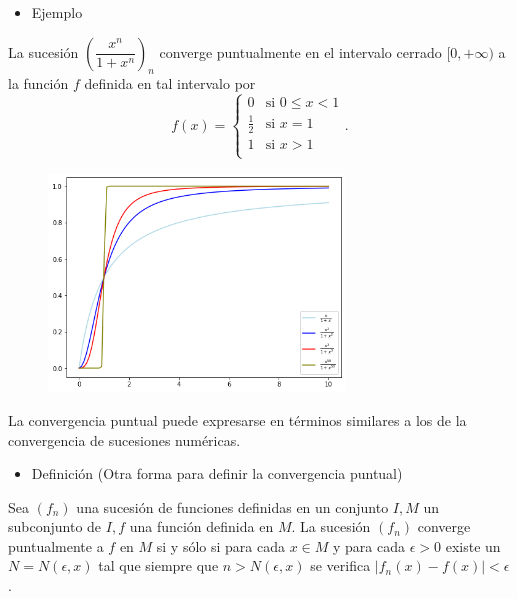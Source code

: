 \begin{itemize}[label=\color{red}\textbullet, leftmargin=*]
	\item \color{lightblue}Ejemplo
\end{itemize}
La sucesión $\left(\dfrac{x^n}{1+x^n}\right)_n$ converge puntualmente en el intervalo cerrado $[0,+\infty)$ a la función $f$ definida en tal intervalo por \[ f(x)=\left\{\begin{array}{ll}
	0 & \text{si }0\le x <1\\
	\frac{1}{2} & \text{si }x=1\\
	1 & \text{si } x >1\\
\end{array}\right.. \]

\begin{figure}[h]
	\centering
	\includegraphics[width=0.7\textwidth]{"Temas/Tema 4/Gráfica 2.png"}
\end{figure}


La convergencia puntual puede expresarse en términos similares a los de la convergencia de sucesiones numéricas.
\begin{itemize}[label=\color{red}\textbullet, leftmargin=*]
	\item \color{lightblue}Definición (Otra forma para definir la convergencia puntual)
\end{itemize}
Sea $(f_n)$ una sucesión de funciones definidas en un conjunto $I,M$ un subconjunto de $I,f$ una función definida en $M$. La sucesión $(f_n)$ converge puntualmente a $f$ en $M$ si y sólo si para cada $x\in M$ y para cada $\epsilon>0$ existe un $N=N(\epsilon,x)$ tal que siempre que $n>N(\epsilon,x)$ se verifica $|f_n(x)-f(x)|<\epsilon$.

